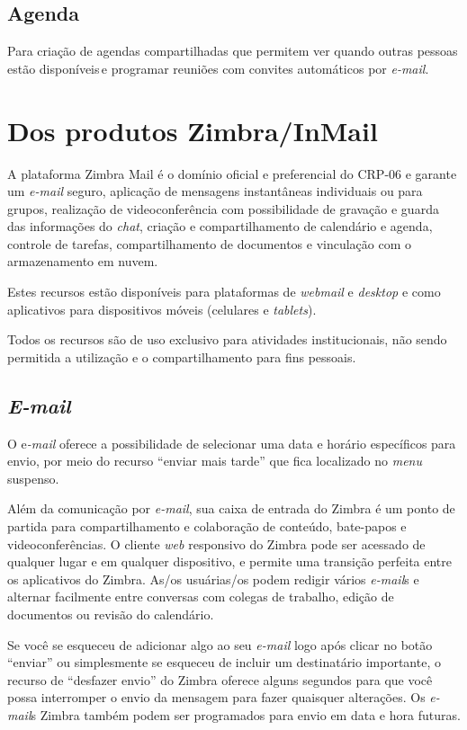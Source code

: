 \documentclass[openright, twoside, a4paper]{memoir}
\begin{document}
\section{Agenda}

Para criação de agendas compartilhadas que permitem ver quando outras
pessoas estão disponíveis\,e programar reuniões com convites automáticos
por \emph{e-mail}.

\clearpage\chapter{Dos produtos Zimbra/InMail}

A plataforma Zimbra Mail é o domínio oficial e preferencial do CRP-06 e
garante um \emph{e-mail} seguro, aplicação de mensagens instantâneas
individuais ou para grupos, realização de videoconferência com
possibilidade de gravação e guarda das informações do \emph{chat},
criação e compartilhamento de calendário e agenda, controle de tarefas,
compartilhamento de documentos e vinculação com o armazenamento em
nuvem.

Estes recursos estão disponíveis para plataformas de \emph{webmail} e
\emph{desktop} e como aplicativos para dispositivos móveis (celulares e
\emph{tablets}).

Todos os recursos são de uso exclusivo para atividades institucionais,
não sendo permitida a utilização e o compartilhamento para fins
pessoais.

\section{\emph{E-mail}}

O e\emph{-mail} oferece a possibilidade de selecionar uma data e horário
específicos para envio, por meio do recurso ``enviar mais tarde'' que
fica localizado no \emph{menu} suspenso.

Além da comunicação por \emph{e-mail}, sua caixa de entrada do Zimbra é
um ponto de partida para compartilhamento e colaboração de conteúdo,
bate-papos e videoconferências. O cliente \emph{web} responsivo do
Zimbra pode ser acessado de qualquer lugar e em qualquer dispositivo, e
permite uma transição perfeita entre os aplicativos do Zimbra. As/os
usuárias/os podem redigir vários \emph{e-mail}s e alternar facilmente
entre conversas com colegas de trabalho, edição de documentos ou revisão
do calendário.

Se você se esqueceu de adicionar algo ao seu \emph{e-mail} logo após
clicar no botão ``enviar'' ou simplesmente se esqueceu de incluir um
destinatário importante, o recurso de ``desfazer envio'' do Zimbra
oferece alguns segundos para que você possa interromper o envio da
mensagem para fazer quaisquer alterações. Os \emph{e-mail}s Zimbra
também podem ser programados para envio em data e hora futuras.
\end{document}
